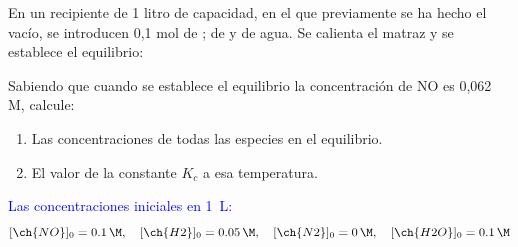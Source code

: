 \begin{exerciseEVAU}
    En un recipiente de 1 litro de capacidad, en el que previamente se ha hecho el vacío, se introducen 0,1 mol de ;  de  y  de agua.
    Se calienta el matraz y se establece el equilibrio:
    \begin{center}
    \end{center}
    Sabiendo que cuando se establece el equilibrio la concentración de NO es 0,062 M, calcule:
    \begin{enumerate}[label=\letraminuscula]
        \item Las concentraciones de todas las especies en el equilibrio.
        \item El valor de la constante \(K_c\) a esa temperatura.
    \end{enumerate}
    \begin{solu}

    \textcolor{blue}{Las concentraciones iniciales en \qty{1}{\L}:}
    \[
        [\ch{NO}]_0 = \qty{0{,}1}{\M},\quad [\ch{H2}]_0 = \qty{0{,}05}{\M},\quad [\ch{N2}]_0 = \qty{0}{\M},\quad [\ch{H2O}]_0 = \qty{0{,}1}{\M}
    \]


\end{solu}
\end{exerciseEVAU}
